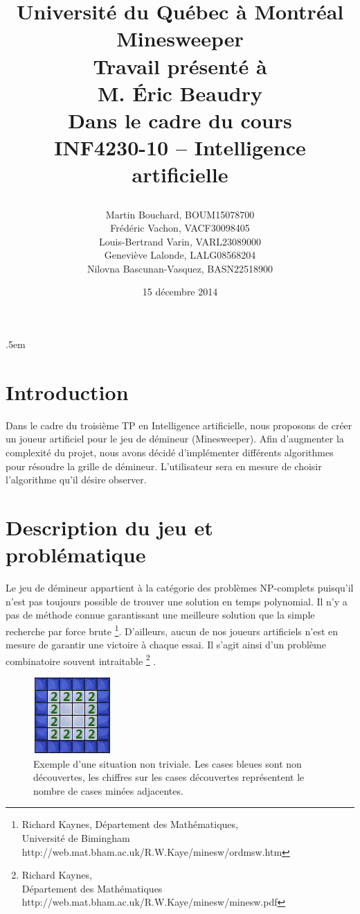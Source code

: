 \documentclass{article}
\title{%
\Large{Université du Québec à Montréal}\\
\vspace{2.5cm}
\Huge{Minesweeper}\\
\vspace{3cm}
\Large{Travail présenté à \\M. Éric Beaudry} \\
\vspace{2cm}
\Large{Dans le cadre du cours \\INF4230-10 – Intelligence artificielle}
\author{Martin Bouchard, BOUM15078700\\Frédéric Vachon, VACF30098405\\Louis-Bertrand Varin,
VARL23089000\\Geneviève Lalonde, LALG08568204\\Nilovna Bascunan-Vasquez, BASN22518900}
\date{\vspace{2cm} 15 décembre 2014}
\vfill
}
\begin{document}
\maketitle

\thispagestyle{empty}
\clearpage

\openup .5em

\section{Introduction}
Dans le cadre du troisième TP en Intelligence artificielle, nous proposons de créer 
un joueur artificiel pour le jeu de démineur (Minesweeper). Afin d’augmenter la complexité 
du projet, nous avons décidé d’implémenter différents algorithmes pour résoudre la 
grille de démineur. L’utilisateur sera en mesure de choisir l’algorithme qu’il désire observer. 

\section{Description du jeu et problématique}
Le jeu de démineur appartient à la catégorie des problèmes NP-complets puisqu’il n’est 
pas toujours possible de trouver une solution en temps polynomial. Il n’y a pas de 
méthode connue garantissant une meilleure solution que la simple recherche par force 
brute \footnote{Richard Kaynes, Département des Mathématiques, \\ Université de Bimingham http://web.mat.bham.ac.uk/R.W.Kaye/minesw/ordmsw.htm}. 
D'ailleurs, aucun de nos joueurs artificiels n'est en mesure de garantir une victoire à chaque essai.
Il s’agit ainsi d’un problème combinatoire souvent intraitable
\footnote{Richard Kaynes, \\ Département des Mathématiques http://web.mat.bham.ac.uk/R.W.Kaye/minesw/minesw.pdf} .

\begin{figure}[h!]
  \caption {Exemple d'une situation non triviale. Les cases bleues sont non découvertes, les chiffres sur les cases découvertes
  représentent le nombre de cases minées adjacentes.}
  \centering
  \includegraphics[scale=.5]{./demineur_1.png}
\end{figure}
\end{document}

